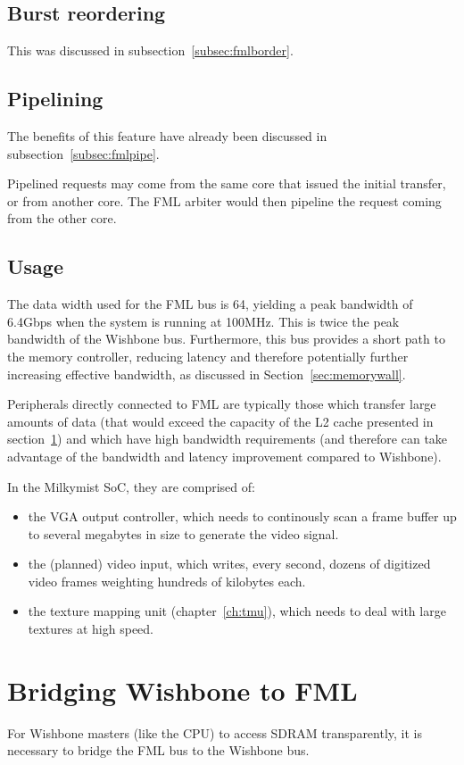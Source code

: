 \documentclass[a4paper,11pt]{kthesis}
\begin{document}
\subsection{Burst reordering}
This was discussed in subsection~\ref{subsec:fmlborder}.

\subsection{Pipelining}
The benefits of this feature have already been discussed in subsection~\ref{subsec:fmlpipe}.

Pipelined requests may come from the same core that issued the initial transfer, or from another core. The FML arbiter would then pipeline the request coming from the other core.

\subsection{Usage}
The data width used for the FML bus is 64, yielding a peak bandwidth of 6.4Gbps when the system is running at 100MHz. This is twice the peak bandwidth of the Wishbone bus. Furthermore, this bus provides a short path to the memory controller, reducing latency and therefore potentially further increasing effective bandwidth, as discussed in Section~\ref{sec:memorywall}.

Peripherals directly connected to FML are typically those which transfer large amounts of data (that would exceed the capacity of the L2 cache presented in section~\ref{sec:fmlbrg}) and which have high bandwidth requirements (and therefore can take advantage of the bandwidth and latency improvement compared to Wishbone).

In the Milkymist SoC, they are comprised of:
\begin{itemize}
\item the VGA output controller, which needs to continously scan a frame buffer up to several megabytes in size to generate the video signal.
\item the (planned) video input, which writes, every second, dozens of digitized video frames weighting hundreds of kilobytes each.
\item the texture mapping unit (chapter~\ref{ch:tmu}), which needs to deal with large textures at high speed.
\end{itemize}

\section{Bridging Wishbone to FML}
\label{sec:fmlbrg}
For Wishbone masters (like the CPU) to access SDRAM transparently, it is necessary to bridge the FML bus to the Wishbone bus.
\end{document}
